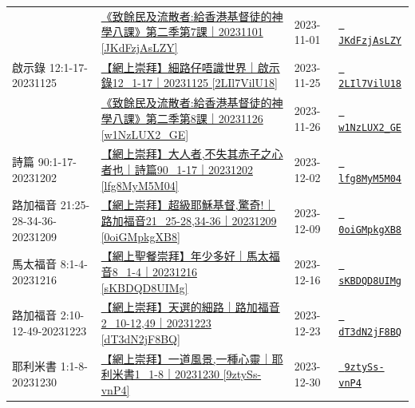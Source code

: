 \documentclass{book}
\begin{document}
{\begin{xltabular}{\textwidth}{|p{0.15\textwidth} p{0.6\textwidth}|p{0.07\textwidth} p{0.1\textwidth}|}
    & \hyperref[sec:JKdFzjAsLZY]{《致餘民及流散者:給香港基督徒的神學八課》第二季第7課｜20231101 [JKdFzjAsLZY]} & 2023-11-01 & \href{https://youtube.com/watch?v=JKdFzjAsLZY}{\texttt{ JKdFzjAsLZY}} \\
啟示錄 12:1-17-20231125 & \hyperref[sec:2LIl7VilU18]{【網上崇拜】細路仔唔識世界｜啟示錄12\_1-17｜20231125 [2LIl7VilU18]} & 2023-11-25 & \href{https://youtube.com/watch?v=2LIl7VilU18}{\texttt{ 2LIl7VilU18}} \\
    & \hyperref[sec:w1NzLUX2_GE]{《致餘民及流散者:給香港基督徒的神學八課》第二季第8課｜20231126 [w1NzLUX2\_GE]} & 2023-11-26 & \href{https://youtube.com/watch?v=w1NzLUX2_GE}{\texttt{ w1NzLUX2\_GE}} \\
詩篇 90:1-17-20231202 & \hyperref[sec:lfg8MyM5M04]{【網上崇拜】大人者,不失其赤子之心者也｜詩篇90\_1-17｜20231202 [lfg8MyM5M04]} & 2023-12-02 & \href{https://youtube.com/watch?v=lfg8MyM5M04}{\texttt{ lfg8MyM5M04}} \\
路加福音 21:25-28-34-36-20231209 & \hyperref[sec:0oiGMpkgXB8]{【網上崇拜】超級耶穌基督,驚奇!｜路加福音21\_25-28,34-36｜20231209 [0oiGMpkgXB8]} & 2023-12-09 & \href{https://youtube.com/watch?v=0oiGMpkgXB8}{\texttt{ 0oiGMpkgXB8}} \\
馬太福音 8:1-4-20231216 & \hyperref[sec:sKBDQD8UIMg]{【網上聖餐崇拜】年少多好｜馬太福音8\_1-4｜20231216 [sKBDQD8UIMg]} & 2023-12-16 & \href{https://youtube.com/watch?v=sKBDQD8UIMg}{\texttt{ sKBDQD8UIMg}} \\
路加福音 2:10-12-49-20231223 & \hyperref[sec:dT3dN2jF8BQ]{【網上崇拜】天選的細路｜路加福音2\_10-12,49｜20231223 [dT3dN2jF8BQ]} & 2023-12-23 & \href{https://youtube.com/watch?v=dT3dN2jF8BQ}{\texttt{ dT3dN2jF8BQ}} \\
耶利米書 1:1-8-20231230 & \hyperref[sec:9ztySs_vnP4]{【網上崇拜】一道風景,一種心靈｜耶利米書1\_1-8｜20231230 [9ztySs-vnP4]} & 2023-12-30 & \href{https://youtube.com/watch?v=9ztySs-vnP4}{\texttt{ 9ztySs-vnP4}} \\
\end{xltabular}
}
\newpage
\end{document}
